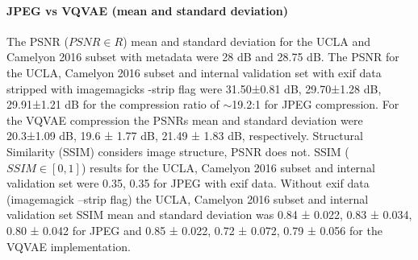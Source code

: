 \documentclass[review]{elsarticle}
\begin{document}
\paragraph{JPEG vs VQVAE (mean and standard deviation)} The PSNR ($PSNR\in R$) mean and standard deviation for the UCLA and Camelyon 2016 subset with metadata were 28 dB and 28.75 dB. The PSNR for the UCLA, Camelyon 2016 subset and internal validation set with exif data stripped with imagemagicks -strip flag were 31.50±0.81 dB, 29.70±1.28 dB, 29.91±1.21 dB for the compression ratio of $\sim$19.2:1 for JPEG compression. For the VQVAE compression the PSNRs mean and standard deviation were 20.3±1.09 dB, 19.6 ± 1.77 dB, 21.49 ± 1.83 dB, respectively. Structural Similarity (SSIM) considers image structure, PSNR does not. SSIM ($SSIM\in [0,1]$) results for the UCLA, Camelyon 2016 subset and internal validation set were 0.35, 0.35 for JPEG with exif data. Without exif data (imagemagick –strip flag) the UCLA, Camelyon 2016 subset and internal validation set SSIM mean and standard deviation was 0.84 ± 0.022, 0.83 ± 0.034, 0.80 ± 0.042 for JPEG and 0.85 ± 0.022, 0.72 ± 0.072, 0.79 ± 0.056 for the VQVAE implementation.

\end{document}
